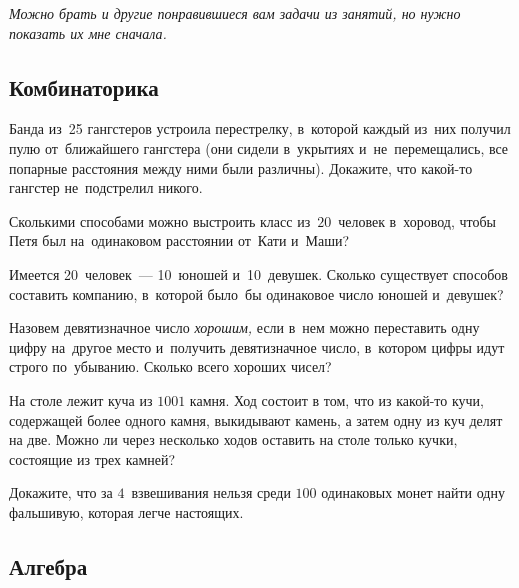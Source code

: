 



\emph{Можно брать и другие понравившиеся вам задачи из занятий, но нужно
показать их мне сначала.}

\subsection*{Комбинаторика}

\begin{problems}

\item
Банда из~25 гангстеров устроила перестрелку, в~которой каждый из~них получил
пулю от~ближайшего гангстера
(они сидели в~укрытиях и~не~перемещались, все попарные расстояния между ними
были различны).
Докажите, что какой-то гангстер не~подстрелил никого.

\item
Сколькими способами можно выстроить класс из~$20$~человек в~хоровод, чтобы Петя
был на~одинаковом расстоянии от~Кати и~Маши?

\item
Имеется 20~человек~--- 10~юношей и~10~девушек.
Сколько существует способов составить компанию, в~которой было~бы одинаковое
число юношей и~девушек?

\item
Назовем девятизначное число \emph{хорошим,} если в~нем можно переставить одну
цифру на~другое место и~получить девятизначное число, в~котором цифры идут
строго по~убыванию.
Сколько всего хороших чисел?

\item
На столе лежит куча из $1001$ камня.
Ход состоит в том, что из какой-то кучи, содержащей более одного камня,
выкидывают камень, а затем одну из куч делят на две.
Можно ли через несколько ходов оставить на столе только кучки, состоящие из
трех камней?

\item
Докажите, что за $4$~взвешивания нельзя среди $100$ одинаковых монет найти
одну фальшивую, которая легче настоящих.

\end{problems}

\subsection*{Алгебра}

